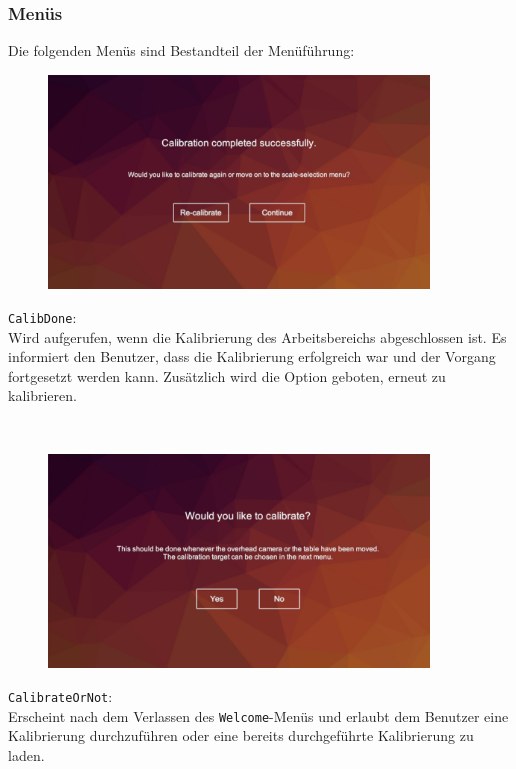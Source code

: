 \subsubsection{Menüs}\label{sec:menus}
Die folgenden Menüs sind Bestandteil der Menüführung:

\begin{minipage}{0.6\textwidth}
	\begin{figure}[H] 
		\includegraphics[trim=3cm 2cm 3cm 2cm, clip, width=0.9\textwidth]{Bilder/CalibDone.jpg}
			\label{fig:CalibDone}
	\end{figure}
\end{minipage}
\begin{minipage}{0.4\textwidth}
	\texttt{CalibDone}:\\
	Wird aufgerufen, wenn die Kalibrierung des Arbeitsbereichs abgeschlossen ist. Es informiert den Benutzer, dass die Kalibrierung erfolgreich war und der Vorgang fortgesetzt werden kann. Zusätzlich wird die Option geboten, erneut zu kalibrieren.
\end{minipage}\\

\begin{minipage}{0.6\textwidth}
	\begin{figure}[H] 
		\includegraphics[trim=3cm 2cm 2cm 2cm, clip, width=0.9\textwidth]{Bilder/CalibrateOrNot.jpg}
			\label{fig:CalibrateOrNot}
	\end{figure}
\end{minipage}
\begin{minipage}{0.4\textwidth}
	\texttt{CalibrateOrNot}:\\
	Erscheint nach dem Verlassen des \texttt{Welcome}-Menüs und erlaubt dem Benutzer eine Kalibrierung durchzuführen oder eine bereits durchgeführte Kalibrierung zu laden.
\end{minipage}\\

